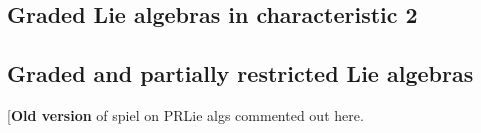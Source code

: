 \documentclass[11pt]{amsart}
\theoremstyle{plain}
\theoremstyle{definition}
\DeclareMathOperator{\im}{im}
\newcommand{\DASH}{\textup{--}}
\renewcommand{\to}{\longrightarrow}
\newcommand{\scrL}{\mathscr{L}}
\newcommand{\calV}{\mathcal{V}}
\theoremstyle{plain}
\newcommand{\LieOperad}{{\scrL}}
\newcommand{\restn}[1]{#1^{[2]}}
\newcommand{\vect}[2]{\calV^{#1}_{#2}}
\begin{document}
\begin{Lie algebras in characteristic 2 and their homotopy operations}

\section{\textbf{Graded Lie algebras in characteristic 2}}\label{sec on Lie algs and homotopy ops}

\subsection{Graded and partially restricted Lie algebras}
[\textbf{Old version} of spiel on PRLie algs commented out here.%
%
%

\end{Lie algebras in characteristic 2 and their homotopy operations}
\end{document}
